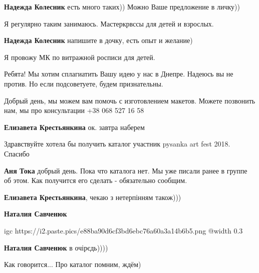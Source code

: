 \begin{itemize} %
\textbf{Надежда Колесник} есть много таких)) Можно Ваше предложение в личку))


Я регулярно таким занимаюсь. Мастеркрвссы для детей и взрослых.

\textbf{Надежда Колесник} напишите в дочку, есть опыт и желание)

\end{itemize} %


Я провожу МК по витражной росписи для детей.


Ребята! Мы хотим сплагиатить Вашу идею у нас в Днепре. Надеюсь вы не против. Но
если подсоветуете, будем признательны.

\begin{itemize} %

Добрый день, мы можем вам помочь с изготовлением макетов. Можете позвонить нам,
мы про консультации +38 068 527 16 58

\textbf{Елизавета Крестьянкина} ок. завтра наберем
\end{itemize} %


Здравствуйте хотела бы получить каталог участник pysanka art fest 2018. Спасибо

\begin{itemize} %
\textbf{Аня Тока} добрый день. Пока что каталога нет. Мы уже писали ранее в группе об этом. Как получится его сделать - обязательно сообщим.

\textbf{Елизавета Крестьянкина}, чекаю з нетерпінням також)))

\textbf{Наталия Савченюк}

\ifcmt
  igc https://i2.paste.pics/e88ba90d6cf3bd6ebc76a60a3a14b6b5.png
	@width 0.3
\fi

\textbf{Наталия Савченюк} в очірєдь))))


Как говорится... Про каталог помним, ждём)

\end{itemize} %

